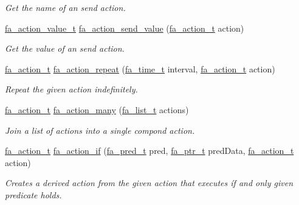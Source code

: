 \begin{DoxyCompactItemize}
\begin{DoxyCompactList}\small\item\em Get the name of an send action. \end{DoxyCompactList}\item 
\hyperlink{group___fa_action_gaac4d474d26b235df5826124cb43464ce}{fa\-\_\-action\-\_\-value\-\_\-t} \hyperlink{group___fa_action_ga986a52955699094b178f850b92cb8bf0}{fa\-\_\-action\-\_\-send\-\_\-value} (\hyperlink{group___fa_action_gadb08ae063168671e5fedc6c23f20ae4b}{fa\-\_\-action\-\_\-t} action)
\begin{DoxyCompactList}\small\item\em Get the value of an send action. \end{DoxyCompactList}\item 
\hyperlink{group___fa_action_gadb08ae063168671e5fedc6c23f20ae4b}{fa\-\_\-action\-\_\-t} \hyperlink{group___fa_action_ga6e81ed66fec37b463601b62909051d6d}{fa\-\_\-action\-\_\-repeat} (\hyperlink{group___fa_time_ga227cc693f20b4873fed11028bcade184}{fa\-\_\-time\-\_\-t} interval, \hyperlink{group___fa_action_gadb08ae063168671e5fedc6c23f20ae4b}{fa\-\_\-action\-\_\-t} action)
\begin{DoxyCompactList}\small\item\em Repeat the given action indefinitely. \end{DoxyCompactList}\item 
\hyperlink{group___fa_action_gadb08ae063168671e5fedc6c23f20ae4b}{fa\-\_\-action\-\_\-t} \hyperlink{group___fa_action_ga9cd15b8d36f69d4ccb4e278a6cd97a32}{fa\-\_\-action\-\_\-many} (\hyperlink{group___fa_list_ga35ecb12ab934ded0cce0bcf28e3bc5d2}{fa\-\_\-list\-\_\-t} actions)
\begin{DoxyCompactList}\small\item\em Join a list of actions into a single compond action. \end{DoxyCompactList}\item 
\hyperlink{group___fa_action_gadb08ae063168671e5fedc6c23f20ae4b}{fa\-\_\-action\-\_\-t} \hyperlink{group___fa_action_ga90164c782d5a2a1e94cebd8828f36ea3}{fa\-\_\-action\-\_\-if} (\hyperlink{group___fa_gae6b6ae9fb073db0ba0bd323d511c6a98}{fa\-\_\-pred\-\_\-t} pred, \hyperlink{group___fa_ga915ddeae99ad7568b273d2b876425197}{fa\-\_\-ptr\-\_\-t} pred\-Data, \hyperlink{group___fa_action_gadb08ae063168671e5fedc6c23f20ae4b}{fa\-\_\-action\-\_\-t} action)
\begin{DoxyCompactList}\small\item\em Creates a derived action from the given action that executes íf and only given predicate holds. \end{DoxyCompactList}\item 

\end{DoxyCompactItemize}
